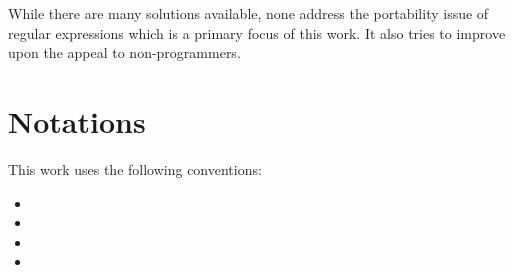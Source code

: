 While there are many solutions available, none address the portability issue of regular expressions which is a primary focus of this work. It also tries to improve upon the appeal to non-programmers.

\section{Notations}

This work uses the following conventions:

\begin{itemize}
    \item {}
    \item {}
    \item {}
    \item {}
\end{itemize}
